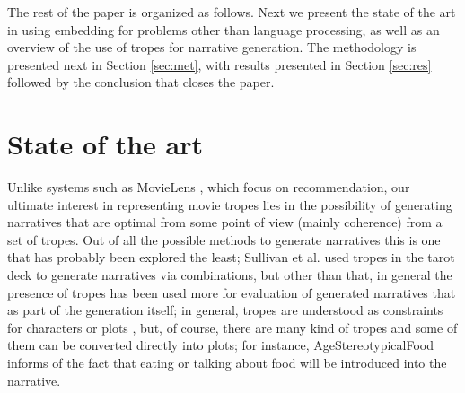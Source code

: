 \documentclass[letterpaper]{article}
\begin{document}
	
	
	
	
	The rest of the paper is organized as follows. Next we present the
	state of the art in using embedding for problems other than language
	processing, as well as an overview of the use of tropes for narrative
	generation. The methodology is presented next in Section
	\ref{sec:met}, with results presented in Section \ref{sec:res}
	followed by the conclusion that closes the paper.
	
	
	\section{State of the art}
	
	Unlike systems such as MovieLens \cite{10.1145/2827872}, which focus
	on recommendation, our ultimate
	interest in representing movie tropes lies in the possibility of
	generating narratives \cite{10.5555/931357} that are optimal from some point of view (mainly
	coherence) from a set of tropes. Out of all the possible methods to
	generate narratives \cite{van2019narrative} this is one that has
	probably been explored the least; Sullivan et
	al. \cite{10.1145/3235765.3235819} used tropes in the tarot deck to
	generate narratives via combinations, but other than that, in general
	the presence of tropes has been used more for evaluation of generated
	narratives \cite{gervas2012story} that as part of the generation
	itself; in general, tropes are understood as constraints for
	characters or plots \cite{Thompson18NarrativeEvents}, but, of course,
	there are many kind of tropes and some of them can be converted
	directly into plots; for instance, {\sf AgeStereotypicalFood} informs
	of the fact that eating or talking about food will be introduced into
	the narrative.
	
\end{document}
